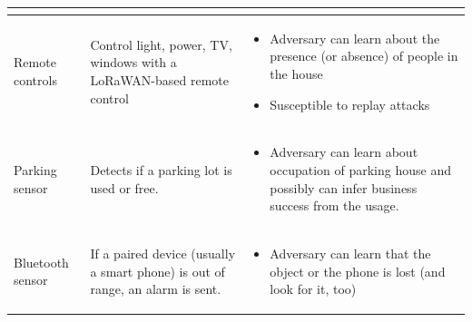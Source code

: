 {\begin{longtable}[c]{|l|l|l|}
\begin{minipage}[t]{0.40\columnwidth}
\begin{itemize}
\end{itemize}
\strut\end{minipage}\tabularnewline
\hline
\begin{minipage}[t]{0.20\columnwidth}\raggedright\strut
{Remote controls}
\strut\end{minipage} &
\begin{minipage}[t]{0.30\columnwidth}\raggedright\strut
{Control light, power, TV, windows with a LoRaWAN-based remote control}
\strut\end{minipage} &
\begin{minipage}[t]{0.40\columnwidth}\raggedright\strut
\begin{itemize}
\tightlist
\item
  {Adversary can learn about the presence (or absence) of people in the house}
\item
  {Susceptible to replay attacks}
\end{itemize}
\strut\end{minipage}\tabularnewline
\hline
\begin{minipage}[t]{0.20\columnwidth}\raggedright\strut
{Parking sensor}
\strut\end{minipage} &
\begin{minipage}[t]{0.30\columnwidth}\raggedright\strut
{Detects if a parking lot is used or free.}
\strut\end{minipage} &
\begin{minipage}[t]{0.40\columnwidth}\raggedright\strut
\begin{itemize}
\tightlist
\item
  {Adversary can learn about occupation of parking house and possibly
  can infer business success from the usage.}
\end{itemize}
\strut\end{minipage}\tabularnewline
\hline
\begin{minipage}[t]{0.20\columnwidth}\raggedright\strut
{Bluetooth sensor}
\strut\end{minipage} &
\begin{minipage}[t]{0.30\columnwidth}\raggedright\strut
{If a paired device (usually a smart phone) is out of range, an alarm is sent.}
\strut\end{minipage} &
\begin{minipage}[t]{0.40\columnwidth}\raggedright\strut
\begin{itemize}
\tightlist
\item
  {Adversary can learn that the object or the phone is lost (and look
  for it, too)}

\end{itemize}
\end{minipage}
\end{longtable}}
